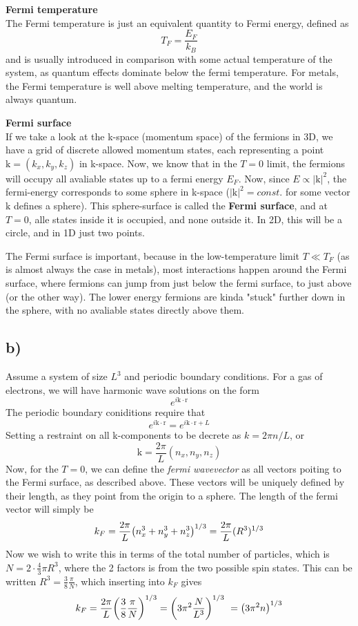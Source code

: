 \documentclass[12p,a4paper]{article}
\renewcommand{\exp}{e^}
\renewcommand{\b}[1]{\boldsymbol{\mathrm{#1}}}
\renewcommand{\exp}{e^}
\begin{document}
\textbf{Fermi temperature}\\
The Fermi temperature is just an equivalent quantity to Fermi energy, defined as
\[
    T_F = \frac{E_F}{k_B}
\]
and is usually introduced in comparison with some actual temperature of the system, as quantum effects dominate below the fermi temperature. For metals, the Fermi temperature is well above melting temperature, and the world is always quantum.

\textbf{Fermi surface}\\
If we take a look at the k-space (momentum space) of the fermions in 3D, we have a grid of discrete allowed momentum states, each representing a point $\b k = (k_x, k_y, k_z)$ in k-space. Now, we know that in the $T=0$ limit, the fermions will occupy all avaliable states up to a fermi energy $E_F$. Now, since $E \propto |\b k|^2$, the fermi-energy corresponds to some sphere in k-space ($|\b k|^2 = const.$ for some vector $\b k$ defines a sphere). This sphere-surface is called the \textbf{Fermi surface}, and at $T=0$, alle states inside it is occupied, and none outside it. In 2D, this will be a circle, and in 1D just two points.

The Fermi surface is important, because in the low-temperature limit $T \ll T_F$ (as is almost always the case in metals), most interactions happen around the Fermi surface, where fermions can jump from just below the fermi surface, to just above (or the other way). The lower energy fermions are kinda "stuck" further down in the sphere, with no avaliable states directly above them.


\subsection*{b)}
Assume a system of size $L^3$ and periodic boundary conditions. For a gas of electrons, we will have harmonic wave solutions on the form
\[
    \exp{i \b k\cdot \b r}
\]
The periodic boundary coniditions require that
\[
    \exp{i \b k\cdot \b r}  = \exp{i \b k \cdot \b r + L}
\]
Setting a restraint on all k-components to be decrete as $k = 2\pi n/L$, or 
\[
    \b k = \frac{2\pi}{L}(n_x, n_y, n_z)
\]
Now, for the $T=0$, we can define the \textit{fermi wavevector} as all vectors poiting to the Fermi surface, as described above. These vectors will be uniquely defined by their length, as they point from the origin to a sphere. The length of the fermi vector will simply be
\[
    k_F = \frac{2\pi}{L}\qty(n_x^3 + n_y^3 + n_z^3)^{1/3} = \frac{2\pi}{L}(R^3)^{1/3}
\]
Now we wish to write this in terms of the total number of particles, which is $N = 2\cdot \frac{4}{3}\pi R^3$, where the 2 factors is from the two possible spin states. This can be written $R^3 = \frac{3}{8}\frac{\pi}{N}$, which inserting into $k_F$ gives
\[
    k_F = \frac{2\pi}{L}\qty(\frac{3}{8}\frac{\pi}{N})^{1/3} = \qty(3\pi^2 \frac{N}{L^3})^{1/3} = \qty(3\pi^2n)^{1/3}
\]
\end{document}
